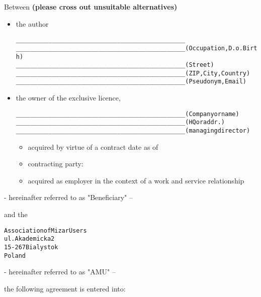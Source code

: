 Between 
{\bf (please cross out unsuitable alternatives)}\\
\begin{itemize}
\item the author
\begin{alltt}
    _______________________________________________
    _______________________________________________ (Occupation, D.o. Birth)
    _______________________________________________ (Street)
    _______________________________________________ (ZIP, City, Country)
    _______________________________________________ (Pseudonym, Email)
\end{alltt}
\item the owner of the exclusive licence,
\begin{alltt}
    _______________________________________________ (Company or name)
    _______________________________________________ (HQ or addr.)
    _______________________________________________ (managing director)
\end{alltt}
\begin{itemize}
\item acquired by virtue of a contract date as of
\item contracting party:
\item acquired as employer in the context of a work and service
  relationship
\end{itemize}
\end{itemize}
\begin{flushright}
- hereinafter referred to as "Beneficiary" --
\end{flushright}
and the
\begin{alltt}
Association of Mizar Users
ul. Akademicka 2
15-267 Bialystok
Poland 
\end{alltt}
\begin{flushright}
- hereinafter referred to as "AMU" --
\end{flushright}
the following agreement is entered into:\\

